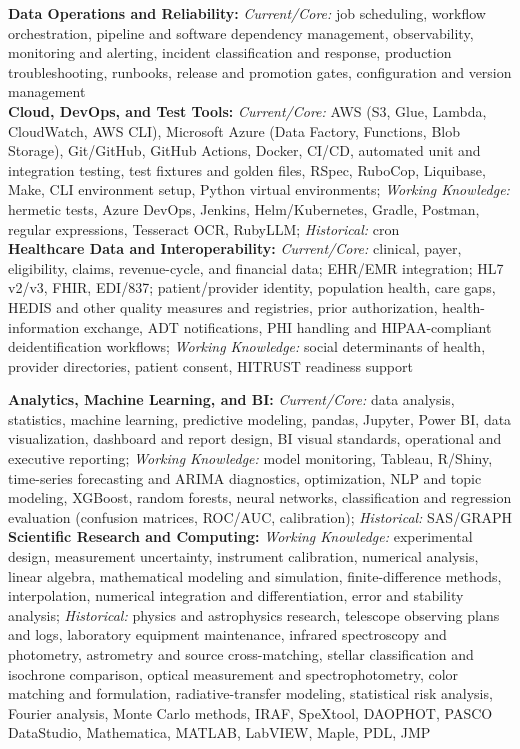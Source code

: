 \textbf{Data Operations and Reliability:} \textit{Current/Core:} job scheduling, workflow orchestration, pipeline and software dependency management, observability, monitoring and alerting, incident classification and response, production troubleshooting, runbooks, release and promotion gates, configuration and version management\\
\textbf{Cloud, DevOps, and Test Tools:} \textit{Current/Core:} AWS (S3, Glue, Lambda, CloudWatch, AWS CLI), Microsoft Azure (Data Factory, Functions, Blob Storage), Git/GitHub, GitHub Actions, Docker, CI/CD, automated unit and integration testing, test fixtures and golden files, RSpec, RuboCop, Liquibase, Make, CLI environment setup, Python virtual environments; \textit{Working Knowledge:} hermetic tests, Azure DevOps, Jenkins, Helm/Kubernetes, Gradle, Postman, regular expressions, Tesseract OCR, RubyLLM; \textit{Historical:} cron\\
\textbf{Healthcare Data and Interoperability:} \textit{Current/Core:} clinical, payer, eligibility, claims, revenue-cycle, and financial data; EHR/EMR integration; HL7 v2/v3, FHIR, EDI/837; patient/provider identity, population health, care gaps, HEDIS and other quality measures and registries, prior authorization, health-information exchange, ADT notifications, PHI handling and HIPAA-compliant deidentification workflows; \textit{Working Knowledge:} social determinants of health, provider directories, patient consent, HITRUST readiness support\par\newpage
\textbf{Analytics, Machine Learning, and BI:} \textit{Current/Core:} data analysis, statistics, machine learning, predictive modeling, pandas, Jupyter, Power BI, data visualization, dashboard and report design, BI visual standards, operational and executive reporting; \textit{Working Knowledge:} model monitoring, Tableau, R/Shiny, time-series forecasting and ARIMA diagnostics, optimization, NLP and topic modeling, XGBoost, random forests, neural networks, classification and regression evaluation (confusion matrices, ROC/AUC, calibration); \textit{Historical:} SAS/GRAPH\\
\textbf{Scientific Research and Computing:} \textit{Working Knowledge:} experimental design, measurement uncertainty, instrument calibration, numerical analysis, linear algebra, mathematical modeling and simulation, finite-difference methods, interpolation, numerical integration and differentiation, error and stability analysis; \textit{Historical:} physics and astrophysics research, telescope observing plans and logs, laboratory equipment maintenance, infrared spectroscopy and photometry, astrometry and source cross-matching, stellar classification and isochrone comparison, optical measurement and spectrophotometry, color matching and formulation, radiative-transfer modeling, statistical risk analysis, Fourier analysis, Monte Carlo methods, IRAF, SpeXtool, DAOPHOT, PASCO DataStudio, Mathematica, MATLAB, LabVIEW, Maple, PDL, JMP\\
